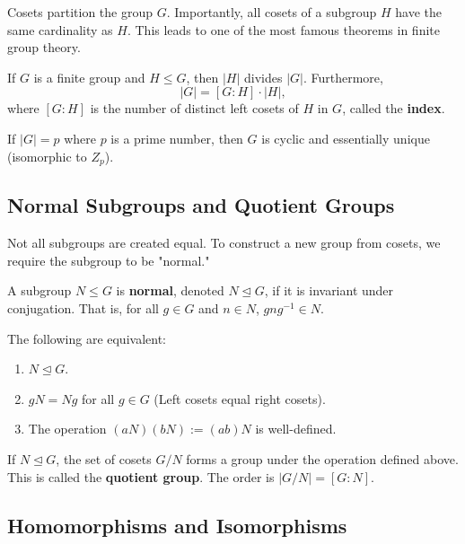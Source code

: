 \documentclass[oneside]{book}
\begin{document}
Cosets partition the group $G$. Importantly, all cosets of a subgroup $H$ have the same cardinality as $H$. This leads to one of the most famous theorems in finite group theory.

\begin{theorem}
If $G$ is a finite group and $H \leq G$, then $|H|$ divides $|G|$. Furthermore,
\[ |G| = [G:H] \cdot |H|, \]
where $[G:H]$ is the number of distinct left cosets of $H$ in $G$, called the \textbf{index}.
\end{theorem}

\begin{corollary}
    If $|G| = p$ where $p$ is a prime number, then $G$ is cyclic and essentially unique (isomorphic to $Z_p$).
\end{corollary}

\subsection{Normal Subgroups and Quotient Groups}

Not all subgroups are created equal. To construct a new group from cosets, we require the subgroup to be "normal."

\begin{definition}
A subgroup $N \leq G$ is \textbf{normal}, denoted $N \trianglelefteq G$, if it is invariant under conjugation. That is, for all $g \in G$ and $n \in N$, $gng^{-1} \in N$.
\end{definition}

\begin{proposition}
The following are equivalent:
\begin{enumerate}
    \item $N \trianglelefteq G$.
    \item $gN = Ng$ for all $g \in G$ (Left cosets equal right cosets).
    \item The operation $(aN)(bN) := (ab)N$ is well-defined.
\end{enumerate}
\end{proposition}

\begin{definition}
If $N \trianglelefteq G$, the set of cosets $G/N$ forms a group under the operation defined above. This is called the \textbf{quotient group}. The order is $|G/N| = [G:N]$.
\end{definition}

\subsection{Homomorphisms and Isomorphisms}
\end{document}
